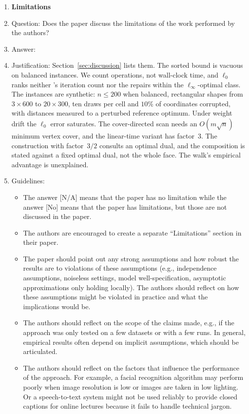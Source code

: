\begin{enumerate}
\item {\bf Limitations}
    \item[] Question: Does the paper discuss the limitations of the work performed by the authors?
    \item[] Answer: \answerYes{}
    \item[] Justification: Section~\ref{sec:discussion} lists them. The sorted bound is vacuous on balanced instances. We count operations, not wall-clock time, and $\ell_0$ ranks neither \citeauthor{chen2022}'s iteration count nor the repairs within the $\ell_\infty$-optimal class. The instances are synthetic: $n\le 200$ when balanced, rectangular shapes from $3\times600$ to $20\times300$, ten draws per cell and $10\%$ of coordinates corrupted, with distances measured to a perturbed reference optimum. Under weight drift the $\ell_0$ error saturates. The cover-directed scan needs an $O(m\sqrt n)$ minimum vertex cover, and the linear-time variant has factor~$3$. The construction with factor~$3/2$ consults an optimal dual, and the composition is stated against a fixed optimal dual, not the whole face. The walk's empirical advantage is unexplained.
    \item[] Guidelines:
    \begin{itemize}
        \item The answer [N/A] means that the paper has no limitation while the answer [No] means that the paper has limitations, but those are not discussed in the paper.
        \item The authors are encouraged to create a separate ``Limitations'' section in their paper.
        \item The paper should point out any strong assumptions and how robust the results are to violations of these assumptions (e.g., independence assumptions, noiseless settings, model well-specification, asymptotic approximations only holding locally). The authors should reflect on how these assumptions might be violated in practice and what the implications would be.
        \item The authors should reflect on the scope of the claims made, e.g., if the approach was only tested on a few datasets or with a few runs. In general, empirical results often depend on implicit assumptions, which should be articulated.
        \item The authors should reflect on the factors that influence the performance of the approach. For example, a facial recognition algorithm may perform poorly when image resolution is low or images are taken in low lighting. Or a speech-to-text system might not be used reliably to provide closed captions for online lectures because it fails to handle technical jargon.

\end{itemize}
\end{enumerate}
